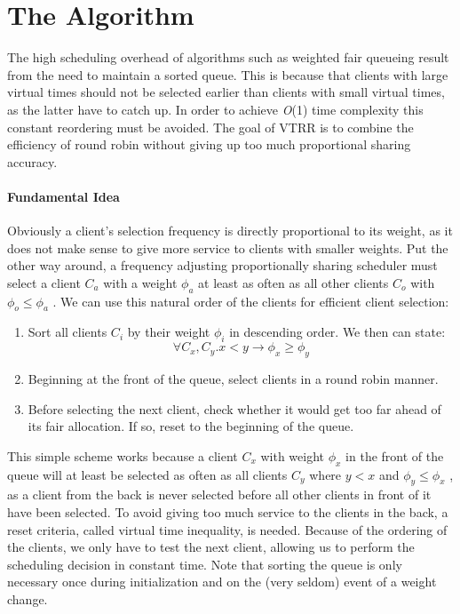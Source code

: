 \section{The Algorithm}

The high scheduling overhead of algorithms such as weighted fair queueing \cite{dks89}
result from the need to maintain a sorted queue. This is because that clients with
large virtual times should not be selected earlier than clients with small virtual times, as the
latter have to catch up. In order to achieve \emph{O}(1) time complexity this constant reordering
must be avoided.
The goal of VTRR is to combine the efficiency of round robin without giving up too much
proportional sharing accuracy.

\paragraph{Fundamental Idea}

Obviously a client’s selection frequency is directly proportional to its weight, as it does
not make sense to give more service to clients with smaller weights. Put the other way
around, a frequency adjusting proportionally sharing scheduler must select a client $C_a$
with a weight $\phi_a$ at least as often as all other clients $C_o$ with $\phi_o \le \phi_a$ . We can use this
natural order of the clients for efficient client selection:
                    
\begin{enumerate}                           
    \item Sort all clients $C_i$ by their weight $\phi_i$ in descending order. We then can state:
      \begin{equation}
        \forall C_x , C_y . x < y \rightarrow \phi_x \ge \phi_y
      \end{equation}

    \item Beginning at the front of the queue, select clients in a round robin manner.
    \item Before selecting the next client, check whether it would get too far ahead of its fair
      allocation. If so, reset to the beginning of the queue.
\end{enumerate}

This simple scheme works because a client $C_x$ with weight $\phi_x$ in the front of the queue
will at least be selected as often as all clients $C_y$ where $y < x$ and $\phi_y \le \phi_x$ , as a client
from the back is never selected before all other clients in front of it have been selected.
To avoid giving too much service to the clients in the back, a reset criteria, called virtual
time inequality, is needed. Because of the ordering of the clients, we only have to test
the next client, allowing us to perform the scheduling decision in constant time. Note that
sorting the queue is only necessary once during initialization and on the (very seldom)
event of a weight change.


